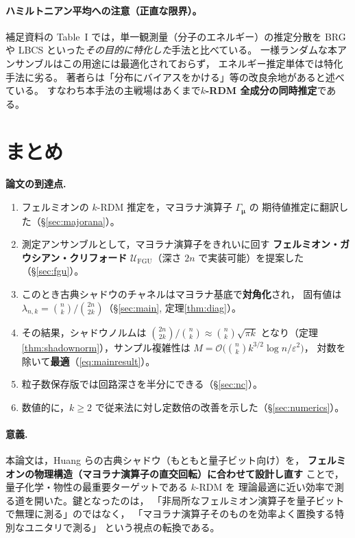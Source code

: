 \documentclass[11pt,a4paper]{ltjsarticle}
\newcommand{\Uc}{\mathcal{U}}
\newcommand{\FGU}{\mathrm{FGU}}
\theoremstyle{definition}
\theoremstyle{plain}
\begin{document}
\paragraph{ハミルトニアン平均への注意（正直な限界）。}
補足資料の Table~I では，単一観測量（分子のエネルギー）の推定分散を
BRG や LBCS といった\emph{その目的に特化した}手法と比べている。
一様ランダムな本アンサンブルはこの用途には最適化されておらず，
エネルギー推定単体では特化手法に劣る。
著者らは「分布にバイアスをかける」等の改良余地があると述べている。
すなわち本手法の主戦場はあくまで\textbf{$k$-RDM 全成分の同時推定}である。

\section{まとめ}\label{sec:summary}

\begin{keybox}
\textbf{論文の到達点.}
\begin{enumerate}
  \item フェルミオンの $k$-RDM 推定を，マヨラナ演算子 $\Gamma_{\bm\mu}$ の
        期待値推定に翻訳した（\S\ref{sec:majorana}）。
  \item 測定アンサンブルとして，マヨラナ演算子をきれいに回す
        \textbf{フェルミオン・ガウシアン・クリフォード}
        $\Uc_\FGU$（深さ $2n$ で実装可能）を提案した（\S\ref{sec:fgu}）。
  \item このとき古典シャドウのチャネルはマヨラナ基底で\textbf{対角化}され，
        固有値は $\lambda_{n,k}=\binom nk/\binom{2n}{2k}$（\S\ref{sec:main}, 定理\ref{thm:diag}）。
  \item その結果，シャドウノルムは $\binom{2n}{2k}/\binom nk\approx\binom nk\sqrt{\pi k}$
        となり（定理\ref{thm:shadownorm}），サンプル複雑性は
        $M=\mathcal O\!\bigl(\binom nk k^{3/2}\log n/\varepsilon^2\bigr)$，
        対数を除いて\textbf{最適}（\eqref{eq:mainresult}）。
  \item 粒子数保存版では回路深さを半分にできる（\S\ref{sec:nc}）。
  \item 数値的に，$k\ge2$ で従来法に対し定数倍の改善を示した（\S\ref{sec:numerics}）。
\end{enumerate}
\end{keybox}

\paragraph{意義.}
本論文は，Huang らの古典シャドウ（もともと量子ビット向け）を，
\textbf{フェルミオンの物理構造（マヨラナ演算子の直交回転）に合わせて設計し直す}
ことで，量子化学・物性の最重要ターゲットである $k$-RDM を
理論最適に近い効率で測る道を開いた。鍵となったのは，
「非局所なフェルミオン演算子を量子ビットで無理に測る」のではなく，
「マヨラナ演算子そのものを効率よく置換する特別なユニタリで測る」
という視点の転換である。
\end{document}
